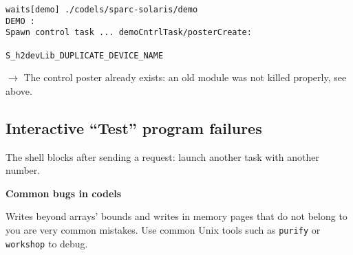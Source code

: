 \begin{center}\begin{cartouche}\small\begin{verbatim}
waits[demo] ./codels/sparc-solaris/demo
DEMO :
Spawn control task ... demoCntrlTask/posterCreate:
                                              S_h2devLib_DUPLICATE_DEVICE_NAME
\end{verbatim}\end{cartouche}\end{center}

$\rightarrow$ The  control poster already  exists: an  old module was not
killed properly, see above.


\subsection{Interactive ``Test'' program failures}

The shell  blocks   after sending  a  request: launch  another  task with
another number.



\bigbreak
{\bf Common bugs in codels}

Writes beyond  arrays'  bounds and  writes  in memory  pages  that do not
belong to you are  very common mistakes.   Use common Unix tools such  as
{\tt purify} or {\tt workshop} to debug.
